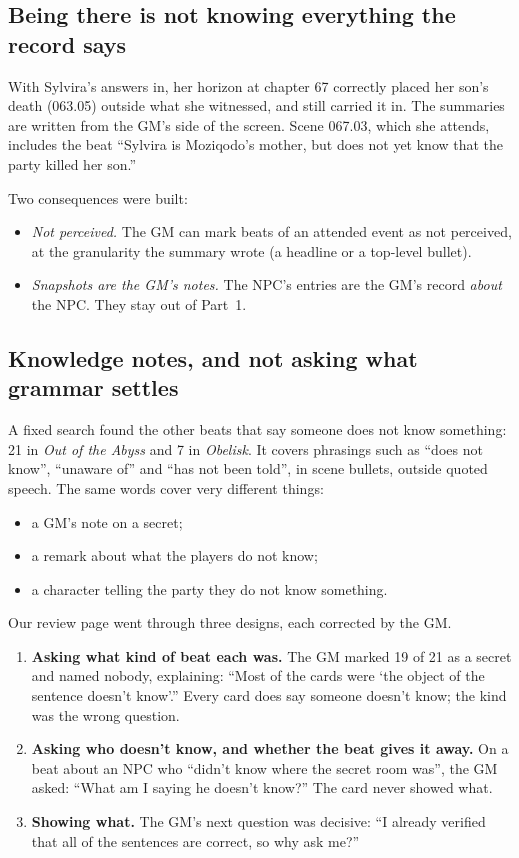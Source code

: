 \documentclass[11pt]{article}
\begin{document}
\subsection{Being there is not knowing everything the record says}

With Sylvira's answers in, her horizon at chapter 67 correctly placed her son's death
(063.05) outside what she witnessed, and still carried it in. The summaries are
written from the GM's side of the screen. Scene 067.03, which she attends, includes
the beat ``Sylvira is Moziqodo's mother, but does not yet know that the party killed
her son.''

Two consequences were built:
\begin{itemize}[nosep]
\item \emph{Not perceived.} The GM can mark beats of an attended event as not
perceived, at the granularity the summary wrote (a headline or a top-level bullet).
\item \emph{Snapshots are the GM's notes.} The NPC's entries are the GM's record
\emph{about} the NPC. They stay out of Part~1.
\end{itemize}

\subsection{Knowledge notes, and not asking what grammar settles}\label{sec:grammar}

A fixed search found the other beats that say someone does not know something: 21 in
\emph{Out of the Abyss} and 7 in \emph{Obelisk}. It covers phrasings such as ``does not
know'', ``unaware of'' and ``has not been told'', in scene bullets, outside quoted
speech. The same words cover very different things:
\begin{itemize}[nosep]
\item a GM's note on a secret;
\item a remark about what the players do not know;
\item a character telling the party they do not know something.
\end{itemize}

Our review page went through three designs, each corrected by the GM.
\begin{enumerate}[nosep]
\item \textbf{Asking what kind of beat each was.} The GM marked 19 of 21 as a secret
and named nobody, explaining: ``Most of the cards were `the object of the sentence
doesn't know'.'' Every card does say someone doesn't know; the kind was the wrong
question.
\item \textbf{Asking who doesn't know, and whether the beat gives it away.} On a beat
about an NPC who ``didn't know where the secret room was'', the GM asked: ``What am I
saying he doesn't know?'' The card never showed what.
\item \textbf{Showing what.} The GM's next question was decisive: ``I already verified
that all of the sentences are correct, so why ask me?''
\end{enumerate}
\end{document}
